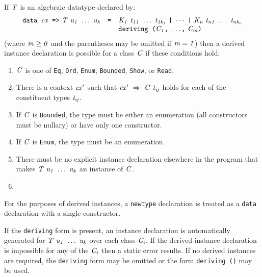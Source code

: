 If \mbox{$\it T$} is an algebraic datatype declared by:
\[\ba{lcl}
\mbox{$\it \makebox{\tt data\ }cx\makebox{\tt \ =>}\ T\ u_1\ \ldots \ u_k$}&\mbox{\tt =}&\mbox{$\it K_1\ t_{11}\ \ldots \ t_{1k_1}\ \makebox{\tt |}\ \cdots\ \makebox{\tt |}\ K_n\ t_{n1}\ \ldots \ t_{nk_n}$}\\
& & \mbox{$\it \makebox{\tt deriving\ (}C_1\makebox{\tt ,}\ \ldots \makebox{\tt ,}\ C_m\makebox{\tt )}$}
\ea\]
(where \mbox{$\it m\geq0$} and the parentheses may be omitted if \mbox{$\it m=1$}) then
a derived instance declaration is possible for a class \mbox{$\it C$} 
if these conditions hold:
\begin{enumerate}
\item
\mbox{$\it C$} is one of \mbox{\tt Eq}, \mbox{\tt Ord}, \mbox{\tt Enum}, \mbox{\tt Bounded}, \mbox{\tt Show}, or \mbox{\tt Read}.

\item
There is a context \mbox{$\it cx'$} such that \mbox{$\it cx'\ \Rightarrow\ C\ t_{ij}$}
holds for each of the constituent types \mbox{$\it t_{ij}$}.

\item
If \mbox{$\it C$} is \mbox{\tt Bounded}, the type must be either an enumeration (all
constructors must be nullary) or have only one constructor.

\item
If \mbox{$\it C$} is \mbox{\tt Enum}, the type must be an enumeration.

\item
There must be no explicit instance declaration elsewhere in the program that
makes \mbox{$\it T\ u_1\ \ldots \ u_k$} an instance of \mbox{$\it C$}.

\item
{}
\end{enumerate}
For the purposes of derived instances, a \mbox{\tt newtype} declaration is
treated as a \mbox{\tt data} declaration with a single constructor.

If the \mbox{\tt deriving} form is present,
an instance declaration is automatically generated for \mbox{$\it T\ u_1\ \ldots \ u_k$}
over each class \mbox{$\it C_i$}.
If the derived instance declaration is impossible for any of the \mbox{$\it C_i$}
then a static error results.
If no derived instances are required, the \mbox{\tt deriving} form may be
omitted or the form \mbox{\tt deriving\ ()} may be used.


